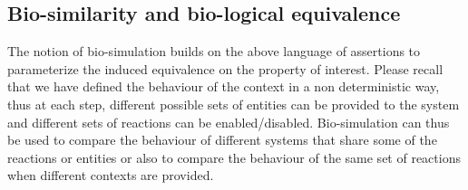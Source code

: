 \subsection{Bio-similarity and bio-logical equivalence}

The notion of bio-simulation builds on the above language of assertions to parameterize the induced equivalence on the property of interest. 
Please recall that we have defined the behaviour of the context in a non deterministic way, thus 
at each step, different possible sets of entities can be provided to the system and different sets of reactions can be enabled/disabled. 
Bio-simulation can thus be used to compare the behaviour of different systems that share some of the reactions or entities or also to compare the behaviour of the same set of reactions when different contexts are provided.



